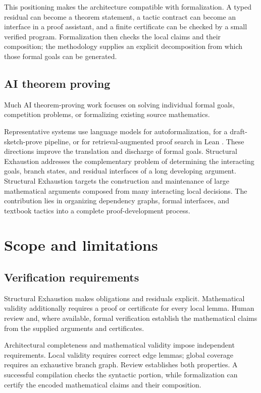 \documentclass[11pt]{article}
\begin{document}
This positioning makes the architecture compatible with formalization. A
typed residual can become a theorem statement, a
tactic contract can become an interface in a proof assistant, and a finite
certificate can be checked by a small verified program. Formalization then
checks the local claims and their composition; the methodology supplies an
explicit decomposition from which those formal goals can be generated.
\subsection{AI theorem proving}
Much AI theorem-proving work focuses on solving individual formal goals, competition problems, or formalizing existing source mathematics.

Representative systems use language models for autoformalization, for a
draft-sketch-prove pipeline, or for retrieval-augmented proof search in Lean
\citep{wu-etal-2022-autoformalization,jiang-etal-2022-draft-sketch-prove,
yang-etal-2023-leandojo}. These directions improve the translation and
discharge of formal goals. Structural Exhaustion addresses the complementary
problem of determining the interacting goals, branch states, and residual
interfaces of a long developing argument.
Structural Exhaustion targets the construction and maintenance of large mathematical arguments composed from many interacting local decisions.
The contribution lies in organizing dependency graphs, formal interfaces, and textbook tactics into a complete proof-development process.
\section{Scope and limitations}
\subsection{Verification requirements}
Structural Exhaustion makes obligations and residuals explicit. Mathematical validity additionally requires a proof or certificate for every local lemma.
Human review and, where available, formal verification establish the mathematical claims from the supplied arguments and certificates.

Architectural completeness and mathematical validity impose independent
requirements. Local validity requires correct edge lemmas; global coverage
requires an exhaustive branch graph. Review establishes both properties. A
successful compilation checks the syntactic portion, while formalization can
certify the encoded mathematical claims and their composition.
\end{document}
